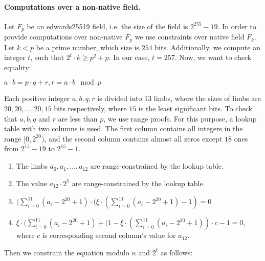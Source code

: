 \paragraph{Computations over a non-native field.}
Let $F_p$ be an edwards25519 field, i.e. the size of the field is $2^{255} - 19$.
In order to provide computations over non-native $F_p$ we use constraints over native field $F_k$.
Let $k < p$ be a prime number, which size is $254$ bits.
Additionally, we compute an integer $t$, such that $2^t \cdot k \geq p^2 + p$.
In our case, $t = 257$.
Now, we want to check equality:
\begin{center}
$a\cdot b = p \cdot q + r, r = a\cdot b \mod p$
\end{center}
Each positive integer $a, b, q, r$ is divided into $13$ limbs, where the sizes of limbs are $20, 20, ..., 20, 15$ bits respectively, where $15$ is the least significant bits.
To check that $a, b, q$ and $r$ are less than $p$, we use range proofs.
For this purpose, a lookup table with two columns is used.
The first column contains all integers in the range $[0, 2^{20})$, and the second column contains almost all zeros except $18$ ones from $2^{15} - 19$ to $2^{15} - 1$.
\begin{enumerate}
\item The limbs $a_0, a_1, ..., a_{12}$ are range-constrained by the lookup table.
\item The value $a_{12} \cdot 2^5$ are range-constrained by the lookup table.
\item $ (\sum_{i = 0}^{11} (a_i - 2^{20} + 1) \cdot (\xi \cdot (\sum_{i = 0}^{11} (a_i - 2^{20} + 1) - 1) = 0$
\item $\xi \cdot (\sum_{i = 0}^{11} (a_i - 2^{20} + 1) + (1 - \xi \cdot (\sum_{i = 0}^{11} (a_i - 2^{20} + 1))\cdot c - 1 = 0$, where $c$ is corresponding second column's value for $a_12$.
\end{enumerate}
Then we constrain the equation modulo $n$ and $2^t$ as follows:

